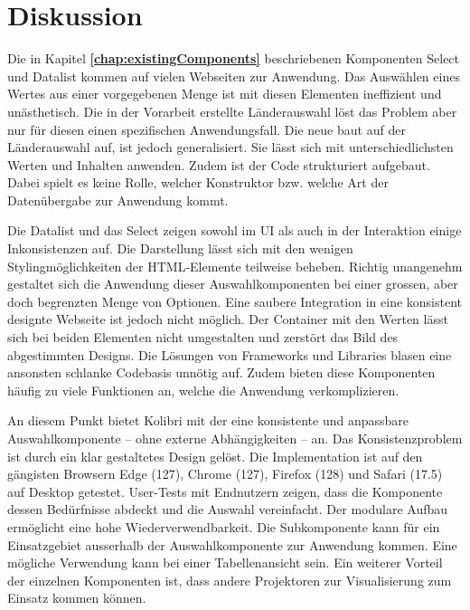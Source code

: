 \chapter{Diskussion}
\label{chap:discussion}

Die in Kapitel \textbf{\ref{chap:existingComponents}} beschriebenen Komponenten Select und Datalist kommen auf vielen Webseiten zur Anwendung. 
Das Auswählen eines Wertes aus einer vorgegebenen Menge ist mit diesen Elementen ineffizient und unästhetisch.
Die in der Vorarbeit erstellte Länderauswahl löst das Problem aber nur für diesen einen spezifischen Anwendungsfall. 
Die neue  baut auf der Länderauswahl auf, ist jedoch generalisiert. 
Sie lässt sich mit unterschiedlichsten Werten und Inhalten anwenden. 
Zudem ist der Code strukturiert aufgebaut. 
Dabei spielt es keine Rolle, welcher Konstruktor bzw. welche Art der Datenübergabe zur Anwendung kommt. 

Die Datalist und das Select zeigen sowohl im UI als auch in der Interaktion einige Inkonsistenzen auf. 
Die Darstellung lässt sich mit den wenigen Stylingmöglichkeiten der HTML-Elemente teilweise beheben. 
Richtig unangenehm gestaltet sich die Anwendung dieser Auswahlkomponenten bei einer grossen, aber doch begrenzten Menge von Optionen. 
Eine saubere Integration in eine konsistent designte Webseite ist jedoch nicht möglich.
Der Container mit den Werten lässt sich bei beiden Elementen nicht umgestalten und zerstört das Bild des abgestimmten Designs. 
Die Lösungen von Frameworks und Libraries blasen eine ansonsten schlanke Codebasis unnötig auf. 
Zudem bieten diese Komponenten häufig zu viele Funktionen an, welche die Anwendung verkomplizieren. 

An diesem Punkt bietet Kolibri mit der  eine konsistente und anpassbare Auswahlkomponente – ohne externe Abhängigkeiten – an. 
Das Konsistenzproblem ist durch ein klar gestaltetes Design gelöst. 
Die Implementation ist auf den gängisten Browsern Edge (127), Chrome (127), Firefox (128) und Safari (17.5) auf Desktop getestet. 
User-Tests mit Endnutzern zeigen, dass die Komponente dessen Bedürfnisse abdeckt und die Auswahl vereinfacht. 
Der modulare Aufbau ermöglicht eine hohe Wiederverwendbarkeit. 
Die Subkomponente  kann für ein Einsatzgebiet ausserhalb der Auswahlkomponente zur Anwendung kommen. 
Eine mögliche Verwendung kann bei einer Tabellenansicht sein. 
Ein weiterer Vorteil der einzelnen Komponenten ist, dass andere Projektoren zur Visualisierung zum Einsatz kommen können. 

